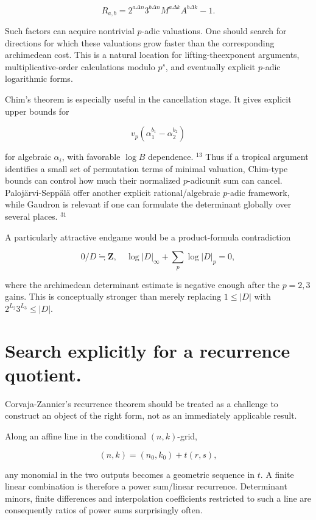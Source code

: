 \documentclass[10pt]{article}
\begin{document}
\begin{equation*}
R_{a, b}=2^{a \Delta n} 3^{b \Delta n} M^{a \Delta k} A^{b \Delta k}-1 . \tag{10}
\end{equation*}


Such factors can acquire nontrivial $p$-adic valuations. One should search for directions for which these valuations grow faster than the corresponding archimedean cost. This is a natural location for lifting-theexponent arguments, multiplicative-order calculations modulo $p^{s}$, and eventually explicit $p$-adic logarithmic forms.

Chim's theorem is especially useful in the cancellation stage. It gives explicit upper bounds for

$$
v_{p}\left(\alpha_{1}^{b_{1}}-\alpha_{2}^{b_{2}}\right)
$$

for algebraic $\alpha_{i}$, with favorable $\log B$ dependence. ${ }^{13}$ Thus if a tropical argument identifies a small set of permutation terms of minimal valuation, Chim-type bounds can control how much their normalized $p$-adicunit sum can cancel. Palojärvi-Seppälä offer another explicit rational/algebraic $p$-adic framework, while Gaudron is relevant if one can formulate the determinant globally over several places. ${ }^{31}$

A particularly attractive endgame would be a product-formula contradiction

$$
0 / D \fallingdotseq \mathbf{Z}, \quad \log |D|_{\infty}+\sum_{p} \log |D|_{p}=0,
$$

where the archimedean determinant estimate is negative enough after the $p=2,3$ gains. This is conceptually stronger than merely replacing $1 \leq|D|$ with $2^{L_{2}} 3^{L_{3}} \leq|D|$.

\section*{Search explicitly for a recurrence quotient.}
Corvaja-Zannier's recurrence theorem should be treated as a challenge to construct an object of the right form, not as an immediately applicable result.

Along an affine line in the conditional $(n, k)$-grid,

$$
(n, k)=\left(n_{0}, k_{0}\right)+t(r, s),
$$

any monomial in the two outputs becomes a geometric sequence in $t$. A finite linear combination is therefore a power sum/linear recurrence. Determinant minors, finite differences and interpolation coefficients restricted to such a line are consequently ratios of power sums surprisingly often.
\end{document}
